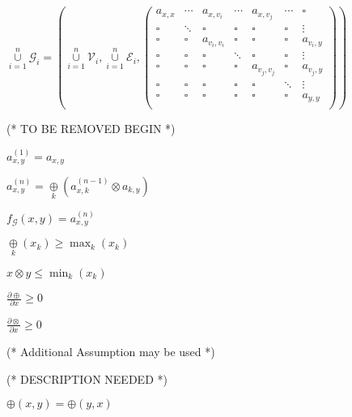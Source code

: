 \documentclass{article}
\begin{document}
\(\underset{i=1}{\overset{n}{\cup }}\mathcal{G}_i=\left(\underset{i=1}{\overset{n}{\cup }}\mathcal{V}_i,\underset{i=1}{\overset{n}{\cup }}\mathcal{E}_i,\left(
\begin{array}{ccccccc}
 a_{x,x} & \cdots  & a_{x,v_i} & \cdots  & a_{x,v_j} & \cdots  & \square  \\
 \square  & \ddots & \square  & \square  & \square  & \square  & \vdots  \\
 \square  & \square  & a_{v_i,v_i} & \square  & \square  & \square  & a_{v_i,y} \\
 \square  & \square  & \square  & \ddots & \square  & \square  & \vdots  \\
 \square  & \square  & \square  & \square  & a_{v_j,v_j} & \square  & a_{v_j,y} \\
 \square  & \square  & \square  & \square  & \square  & \ddots & \vdots  \\
 \square  & \square  & \square  & \square  & \square  & \square  & a_{y,y} \\
\end{array}
\right)\right)\)



(* TO BE REMOVED BEGIN *)


\item \(a_{x,y}^{(1)}=a_{x,y}\)


\item \(a_{x,y}^{(n)}=\underset{k}{\oplus }\left(a_{x,k}^{(n-1)}\otimes a_{k,y}\right)\)


\item \(f_{\mathcal{G}}(x,y)=a_{x,y}^{(n)}\)


\item \(\underset{k}{\oplus }\left(x_k\right)\geqslant \max _k\left(x_k\right)\)


\item \(x\otimes y\leqslant \min _k\left(x_k\right)\)


\item \(\frac{\partial \oplus }{\partial x}\geqslant 0\)


\item \(\frac{\partial \otimes }{\partial x}\geqslant 0\)



(* Additional Assumption may be used *)



(* DESCRIPTION NEEDED *)


\item \(\oplus (x,y)=\oplus (y,x)\)
\end{document}
